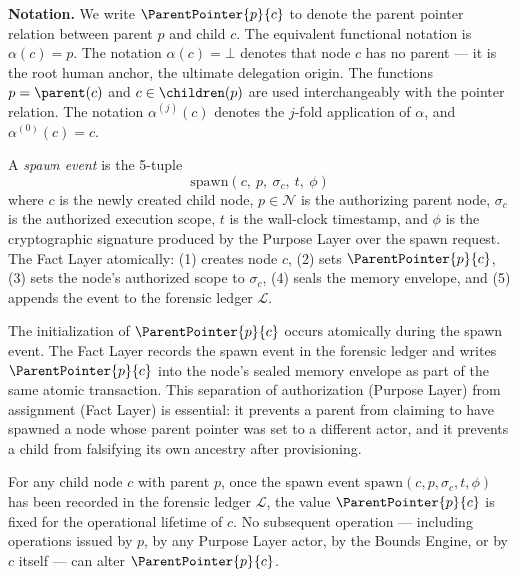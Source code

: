 \documentclass[12pt]{article}
\begin{document}
\medskip
\noindent\textbf{Notation.} We write $\ParentPointer{p}{c}$ to denote the parent pointer relation between parent $p$ and child $c$. The equivalent functional notation is $\alpha(c) = p$. The notation $\alpha(c) = \bot$ denotes that node $c$ has no parent — it is the root human anchor, the ultimate delegation origin. The functions $p = \parent(c)$ and $c \in \children(p)$ are used interchangeably with the pointer relation. The notation $\alpha^{(j)}(c)$ denotes the $j$-fold application of $\alpha$, and $\alpha^{(0)}(c) = c$.

\begin{dfn}
\label{dfn:spawn-event}
A \emph{spawn event} is the 5-tuple
\begin{equation}
\mathrm{spawn}(c,\ p,\ \sigma_c,\ t,\ \phi)
\end{equation}
where $c$ is the newly created child node, $p \in \mathcal{N}$ is the authorizing parent node, $\sigma_c$ is the authorized execution scope, $t$ is the wall-clock timestamp, and $\phi$ is the cryptographic signature produced by the Purpose Layer over the spawn request. The Fact Layer atomically: (1) creates node $c$, (2) sets $\ParentPointer{p}{c}$, (3) sets the node's authorized scope to $\sigma_c$, (4) seals the memory envelope, and (5) appends the event to the forensic ledger $\mathcal{L}$.
\end{dfn}

The initialization of $\ParentPointer{p}{c}$ occurs atomically during the spawn event. The Fact Layer records the spawn event in the forensic ledger and writes $\ParentPointer{p}{c}$ into the node's sealed memory envelope as part of the same atomic transaction. This separation of authorization (Purpose Layer) from assignment (Fact Layer) is essential: it prevents a parent from claiming to have spawned a node whose parent pointer was set to a different actor, and it prevents a child from falsifying its own ancestry after provisioning.

\begin{prop}
\label{prop:parent-pointer-immutable}
For any child node $c$ with parent $p$, once the spawn event $\mathrm{spawn}(c, p, \sigma_c, t, \phi)$ has been recorded in the forensic ledger $\mathcal{L}$, the value $\ParentPointer{p}{c}$ is fixed for the operational lifetime of $c$. No subsequent operation — including operations issued by $p$, by any Purpose Layer actor, by the Bounds Engine, or by $c$ itself — can alter $\ParentPointer{p}{c}$.
\end{prop}
\end{document}
